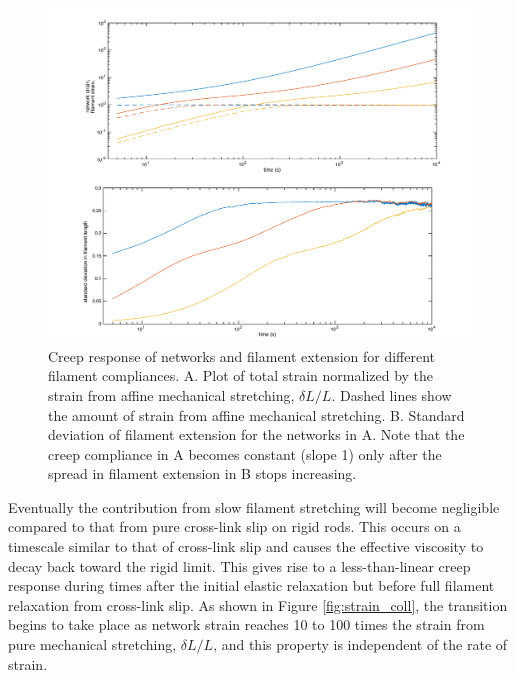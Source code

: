 \documentclass[pre,preprint]{revtex4-1}
\begin{document}
\begin{figure}[h!]
\centering
\includegraphics[width=\hsize]{glass_relax}
\caption{\label{fig:glass_relax} Creep response of networks and filament extension for different filament compliances.  A.  Plot of total strain normalized by the strain from affine mechanical stretching, $\delta L/L$.  Dashed lines show the amount of strain from affine mechanical stretching.   B. Standard deviation of filament extension for the networks in A. Note that the creep compliance in A becomes constant (slope 1) only after the spread in filament extension in B stops increasing.}
\end{figure}




Eventually the contribution from slow filament stretching will become negligible compared to that from pure cross-link slip on rigid rods.  This occurs on a timescale similar to that of cross-link slip and causes the effective viscosity to decay back toward the rigid limit.  This gives rise to a less-than-linear creep response during times after the initial elastic relaxation but before full filament relaxation from cross-link slip.   As shown in Figure \ref{fig:strain_coll}, the transition begins to take place as network strain reaches 10 to 100 times the strain from pure mechanical stretching, $\delta L / L$, and this property is independent of the rate of strain.  
\end{document}
